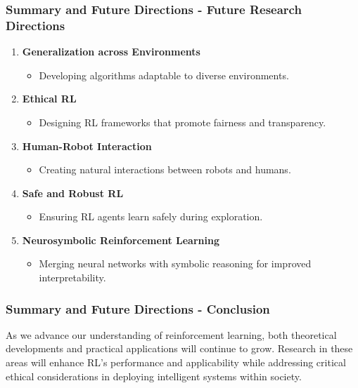 \documentclass{beamer}
\begin{document}
\begin{frame}[fragile]
    \frametitle{Summary and Future Directions - Future Research Directions}
    
    \begin{enumerate}
        \item \textbf{Generalization across Environments}
            \begin{itemize}
                \item Developing algorithms adaptable to diverse environments.
            \end{itemize}
        
        \item \textbf{Ethical RL}
            \begin{itemize}
                \item Designing RL frameworks that promote fairness and transparency.
            \end{itemize}

        \item \textbf{Human-Robot Interaction}
            \begin{itemize}
                \item Creating natural interactions between robots and humans.
            \end{itemize}

        \item \textbf{Safe and Robust RL}
            \begin{itemize}
                \item Ensuring RL agents learn safely during exploration.
            \end{itemize}

        \item \textbf{Neurosymbolic Reinforcement Learning}
            \begin{itemize}
                \item Merging neural networks with symbolic reasoning for improved interpretability.
            \end{itemize}
    \end{enumerate}

\end{frame}

\begin{frame}[fragile]
    \frametitle{Summary and Future Directions - Conclusion}
    
    As we advance our understanding of reinforcement learning, both theoretical developments and practical applications will continue to grow. Research in these areas will enhance RL's performance and applicability while addressing critical ethical considerations in deploying intelligent systems within society.

\end{frame}
\end{document}
